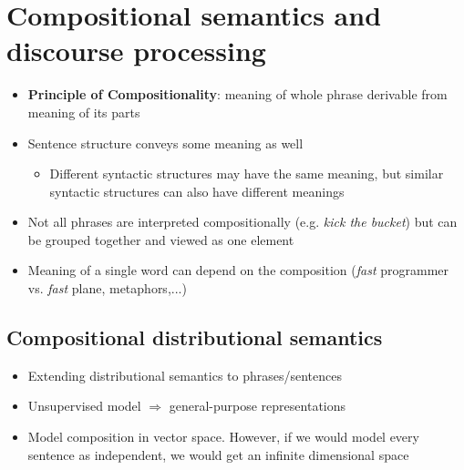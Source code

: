\section{Compositional semantics and discourse processing}
\begin{itemize}
	\item \textbf{Principle of Compositionality}: meaning of whole phrase derivable from meaning of its parts
	\item Sentence structure conveys some meaning as well
	\begin{itemize}
		\item Different syntactic structures may have the same meaning, but similar syntactic structures can also have different meanings
	\end{itemize}
	\item Not all phrases are interpreted compositionally (e.g. \textit{kick the bucket}) but can be grouped together and viewed as one element
	\item Meaning of a single word can depend on the composition (\textit{fast} programmer vs. \textit{fast} plane, metaphors,...)
\end{itemize}
\subsection{Compositional distributional semantics}
\begin{itemize}
	\item Extending distributional semantics to phrases/sentences
	\item Unsupervised model $\Rightarrow$ general-purpose representations
	\item Model composition in vector space. However, if we would model every sentence as independent, we would get an infinite dimensional space
\end{itemize}
